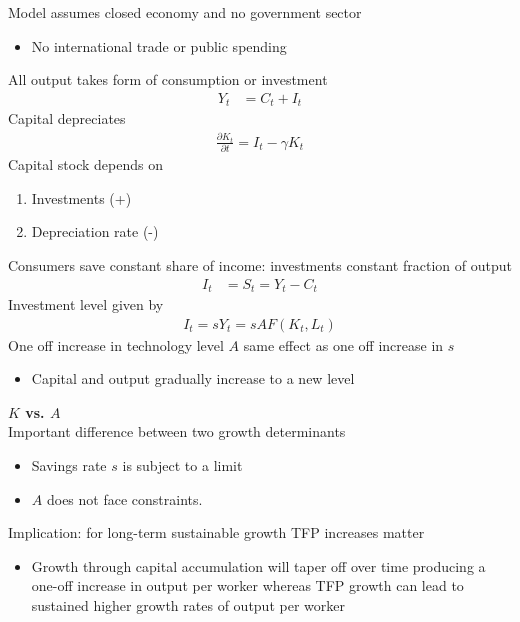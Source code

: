\documentclass{beamer}
\begin{document}
\begin{frame}
  Model assumes closed economy and no government sector
  \begin{itemize}
    \item No international trade or public spending
  \end{itemize}
  \medskip
  All output takes form of consumption or investment
  \begin{align}
       Y_t &= C_t+I_t
  \end{align}
  \medskip
  Capital depreciates
\begin{align}
  \frac{\partial K_t}{\partial t}=I_t -\gamma K_t
\end{align}
Capital stock depends on 
\begin{enumerate}
  \item Investments (+)
  \item Depreciation rate (-)
\end{enumerate}
\end{frame}

\begin{frame}
  Consumers save constant share of income: investments constant fraction of output
\begin{align}
  I_t &= S_t = Y_t-C_t
\end{align}
 \medskip
Investment level given by
\begin{align}
  I_t=sY_t=sAF(K_t,L_t)
\end{align}
One off increase in technology level $A$ same effect as one off increase in $s$ 
 \begin{itemize}
   \item Capital and output gradually increase to a new level
 \end{itemize}
\end{frame}

\begin{frame}
  \textbf{$K$ vs. $A$}\\
  Important difference between two growth determinants 
  \begin{itemize}
    \item Savings rate $s$ is subject to a limit
    \item $A$ does not face constraints. 
  \end{itemize}
  \medskip
  Implication: for long-term sustainable growth TFP increases matter
  \begin{itemize}
    \item Growth through capital accumulation will taper off over time producing a one-off increase in output per worker whereas TFP growth can lead to sustained higher growth rates of output per worker
  \end{itemize}
\end{frame}
\end{document}
